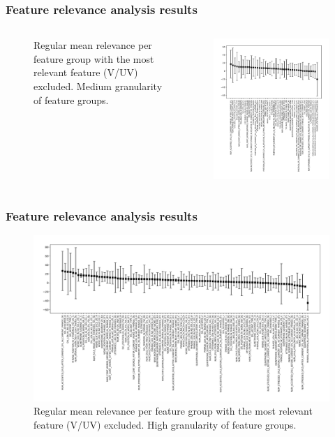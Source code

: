 \documentclass[a4paper,9pt]{beamer}
\theoremstyle{mytheoremstyle}
\begin{document}
\begin{frame}
\frametitle{Feature relevance analysis results}
\begin{columns}
\begin{figure}
	\caption{Regular mean relevance per feature group with the most relevant feature (V/UV) excluded. Medium granularity of feature groups.}
\end{figure}
\begin{center}
  \includegraphics[width=0.8\textwidth]{res/feature_relevance_ranking_-_mean_(sum)_-_detailed_feature_categories_-_no_vuv}
\end{center}
\end{columns}
\end{frame}

\begin{frame}
\frametitle{Feature relevance analysis results}
\begin{figure}
\begin{center}
  \includegraphics[width=\textwidth]{res/feature_relevance_ranking_-_mean_(sum)_-_all_feature_categories_-_no_vuv}
\end{center}
	\caption{Regular mean relevance per feature group with the most relevant feature (V/UV) excluded. High granularity of feature groups.}
\end{figure}
\end{frame}
\end{document}
